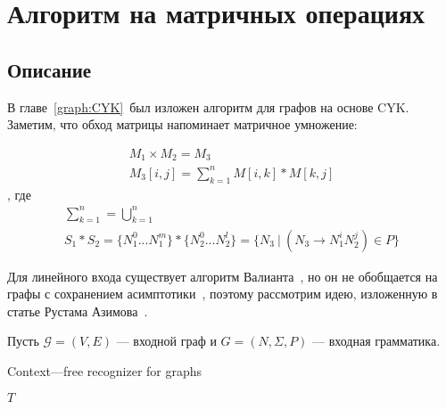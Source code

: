 \chapter{Алгоритм на матричных операциях}
\section{Описание}
\label{Matrix-CFPQ}
В главе~\ref{graph:CYK}~был изложен алгоритм для графов на основе CYK. Заметим, что обход матрицы напоминает матричное умножение:

\begin{gather*}
M_1 \times M_2 = M_3 \\
M_3[i,j] = \sum_{k=1}^{n} M[i,k] * M[k,j]
\end{gather*}
, где
\begin{gather*}
\sum_{k=1}^{n} = \bigcup_{k=1}^{n} \\
S_1 * S_2 = \{N_1^0 ... N_1^m\} * \{N_2^0 ... N_2^l\} = \{N_3~|~(N_3 \rightarrow N_1^i N_2^j) \in P\}
\end{gather*}

Для линейного входа существует алгоритм Валианта~\cite{Valiant:1975:GCR:1739932.1740048}, но он не обобщается на графы с сохранением асимптотики~\cite{Yannakakis}, поэтому рассмотрим идею, изложенную в статье Рустама Азимова~\cite{Azimov:2018:CPQ:3210259.3210264}.

Пусть $\mathcal{G} = (V, E)$ --- входной граф и $G = (N,\Sigma,P)$ --- входная грамматика.

\begin{algorithm}[H]
\begin{algorithmic}[1]
\caption{Context---free recognizer for graphs}
\label{alg:graphParse}
    
    \EndFor    
       
    \EndWhile
\State \Return $T$
\EndFunction
\end{algorithmic}
\end{algorithm}


